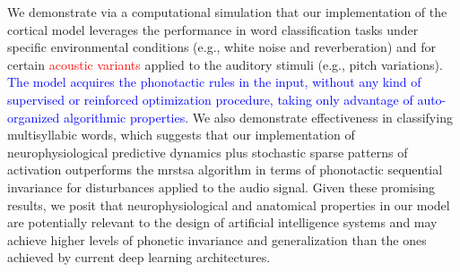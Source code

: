 \documentclass[10pt,letterpaper]{article}
\begin{document}
We demonstrate via a computational simulation that our implementation of the cortical model leverages the performance in word classification tasks under specific environmental conditions (e.g., white noise and reverberation) and for certain \textcolor{red}{acoustic variants} applied to the auditory stimuli (e.g., pitch variations). \textcolor{blue}{The model acquires the phonotactic rules in the input, without any kind of supervised or reinforced optimization procedure, taking only advantage of auto-organized algorithmic properties}. We also demonstrate effectiveness in classifying multisyllabic words, which suggests that our implementation of neurophysiological predictive dynamics plus stochastic sparse patterns of activation outperforms the \gls{mrstsa} algorithm in terms of phonotactic sequential invariance for disturbances applied to the audio signal. Given these promising results, we posit that neurophysiological and anatomical properties in our model are potentially relevant to the design of artificial intelligence systems and may achieve higher levels of phonetic invariance and generalization than the ones achieved by current deep learning architectures.



\end{document}
